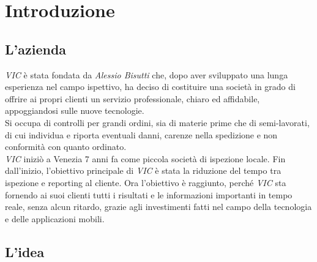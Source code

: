 
\chapter{Introduzione}
\label{cap:introduzione}
\section{L'azienda}

\emph{VIC} è stata fondata da \emph{Alessio Bisutti} che, dopo aver sviluppato una lunga esperienza nel campo ispettivo, ha deciso di costituire una società in grado di offrire ai propri clienti un servizio professionale, chiaro ed affidabile, appoggiandosi sulle nuove tecnologie.\\
Si occupa di controlli per grandi ordini, sia di materie prime che di semi-lavorati, di cui individua e riporta eventuali danni, carenze nella spedizione e non conformità con quanto ordinato.\\
\emph{VIC} iniziò a Venezia 7 anni fa come piccola società di ispezione locale. Fin dall'inizio, l'obiettivo principale di \emph{VIC} è stata la riduzione del tempo tra ispezione e reporting al cliente. Ora l'obiettivo è raggiunto, perché \emph{VIC} sta fornendo ai suoi clienti tutti i risultati e le informazioni importanti in tempo reale, senza alcun ritardo, grazie agli investimenti fatti nel campo della tecnologia e delle applicazioni mobili.

\section{L'idea}

